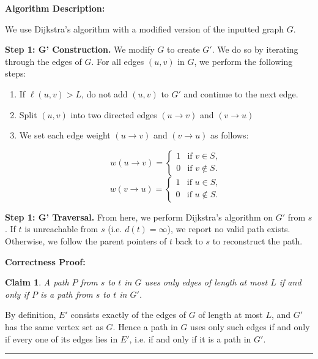 \documentclass[11pt]{article}
\newenvironment{proof}{{\bf Proof:  }}{\hfill\rule{2mm}{2mm}}
\newtheorem{claim}[fact]{Claim}
\begin{document}
\bigbreak

\textbf{Algorithm Description:}

We use Dijkstra's algorithm with a modified version of the inputted graph $G$. 

\medbreak

\textbf{Step 1: G' Construction.} We modify $G$ to create $G'$. We do so by iterating through the edges of $G$. 
For all edges $(u, v)$ in $G$, we perform the following steps:

\begin{enumerate}[label=\arabic*., noitemsep]
    \item If $\ell(u, v) > L$, do not add $(u, v)$ to $G'$ and continue to the next edge.
    \item Split $(u, v)$ into two directed edges $(u \rightarrow v)$ and $(v \rightarrow u)$
    \item We set each edge weight $(u \rightarrow v)$ and $(v \rightarrow u)$ as follows:

$$w(u \rightarrow v) = \begin{cases} 1 & \text{if } v \in S,\\ 0 & \text{if } v \notin S. \end{cases}$$
$$w(v \rightarrow u) = \begin{cases} 1 & \text{if } u \in S,\\ 0 & \text{if } u \notin S. \end{cases}$$

\end{enumerate}

\textbf{Step 1: G' Traversal.} From here, we perform Dijkstra's algorithm on $G'$ from $s$. If $t$ is unreachable from $s$ (i.e. $d(t) = \infty$), 
we report no valid path exists. Otherwise, we follow the parent pointers of $t$ back to $s$ to reconstruct the path.

\bigbreak

\textbf{Correctness Proof:}

\begin{claim}\label{lem:feasible}
A path $P$ from $s$ to $t$ in $G$ uses only edges of length at most $L$ if and only if $P$ is a path from $s$ to $t$ in $G'$.
\end{claim}

\begin{proof}
By definition, $E'$ consists exactly of the edges of $G$ of length at most $L$, and $G'$ has the same vertex set as $G$. 
Hence a path in $G$ uses only such edges if and only if every one of its edges lies in $E'$, i.e. if and only if it is a
path in $G'$.
\end{proof}
\end{document}

